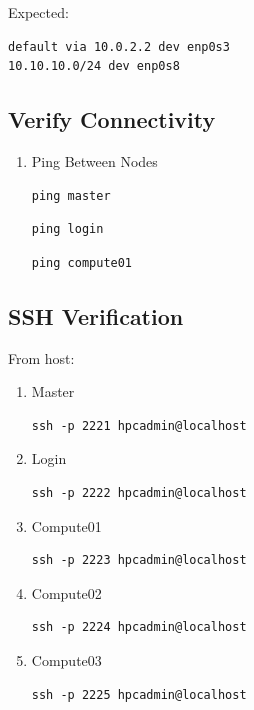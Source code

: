 \documentclass[11pt]{article}
\begin{document}
Expected:

\begin{verbatim}
default via 10.0.2.2 dev enp0s3
10.10.10.0/24 dev enp0s8
\end{verbatim}
\subsection{Verify Connectivity}
\label{sec:org1207405}
\begin{enumerate}
\item Ping Between Nodes
\label{sec:org5c5b954}

\begin{verbatim}
ping master
\end{verbatim}

\begin{verbatim}
ping login
\end{verbatim}

\begin{verbatim}
ping compute01
\end{verbatim}
\end{enumerate}
\subsection{SSH Verification}
\label{sec:org0460a0a}

From host:
\begin{enumerate}
\item Master
\label{sec:orgd5d0a74}

\begin{verbatim}
ssh -p 2221 hpcadmin@localhost
\end{verbatim}
\item Login
\label{sec:orga00517f}

\begin{verbatim}
ssh -p 2222 hpcadmin@localhost
\end{verbatim}
\item Compute01
\label{sec:orgea3c6ef}

\begin{verbatim}
ssh -p 2223 hpcadmin@localhost
\end{verbatim}
\item Compute02
\label{sec:org7bc0799}

\begin{verbatim}
ssh -p 2224 hpcadmin@localhost
\end{verbatim}
\item Compute03
\label{sec:org04674b8}

\begin{verbatim}
ssh -p 2225 hpcadmin@localhost
\end{verbatim}
\end{enumerate}
\end{document}
